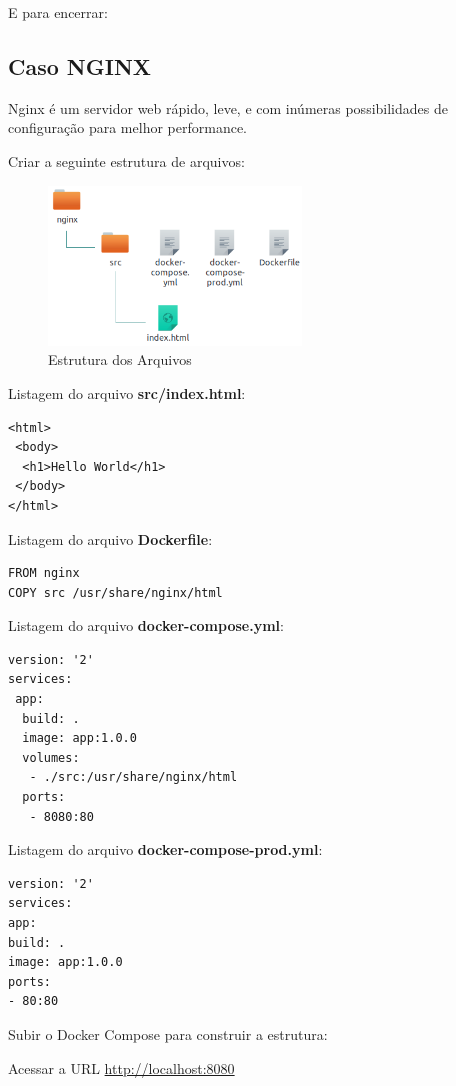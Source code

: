 \documentclass[a4paper,11pt]{article}
\begin{document}
E para encerrar: \\

\subsection{Caso NGINX}
Nginx é um servidor web rápido, leve, e com inúmeras possibilidades de configuração para melhor performance. 

Criar a seguinte estrutura de arquivos:
\begin{figure}[!htb]
	\centering
	\includegraphics[width=0.6\textwidth]{imagem/estnginx.png}
	\caption{Estrutura dos Arquivos}
\end{figure}

Listagem do arquivo \textbf{src/index.html}:
\begin{lstlisting}
<html>
 <body>
  <h1>Hello World</h1>
 </body>
</html>
\end{lstlisting}

Listagem do arquivo \textbf{Dockerfile}:
\begin{lstlisting}
FROM nginx
COPY src /usr/share/nginx/html
\end{lstlisting}

Listagem do arquivo \textbf{docker-compose.yml}:
\begin{lstlisting}
version: '2'
services:
 app:
  build: .
  image: app:1.0.0
  volumes:
   - ./src:/usr/share/nginx/html
  ports:
   - 8080:80 
\end{lstlisting}

Listagem do arquivo \textbf{docker-compose-prod.yml}:
\begin{lstlisting}
version: '2'
services:
app:
build: .
image: app:1.0.0
ports:
- 80:80 
\end{lstlisting}

Subir o Docker Compose para construir a estrutura: \\

Acessar a URL \url{http://localhost:8080}
\end{document}
